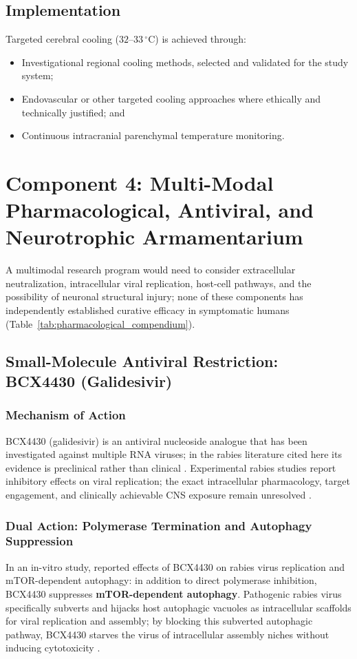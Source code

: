 \documentclass[12pt,a4paper]{article}
\begin{document}
\subsection{Implementation}

Targeted cerebral cooling ($32\text{--}33\,^{\circ}\mathrm{C}$) is achieved through:
\begin{itemize}
    \item Investigational regional cooling methods, selected and validated for the study system;
    \item Endovascular or other targeted cooling approaches where ethically and technically justified; and
    \item Continuous intracranial parenchymal temperature monitoring.
\end{itemize}

\section{Component 4: Multi-Modal Pharmacological, Antiviral, and Neurotrophic Armamentarium}

A multimodal research program would need to consider extracellular neutralization, intracellular viral replication, host-cell pathways, and the possibility of neuronal structural injury; none of these components has independently established curative efficacy in symptomatic humans \citep{scott2008rabies, jackson2013pathogenesis} (Table~\ref{tab:pharmacological_compendium}).

\subsection{Small-Molecule Antiviral Restriction: BCX4430 (Galidesivir)}

\subsubsection{Mechanism of Action}
BCX4430 (galidesivir) is an antiviral nucleoside analogue that has been investigated against multiple RNA viruses; in the rabies literature cited here its evidence is preclinical rather than clinical \citep{xie2023bcx}. Experimental rabies studies report inhibitory effects on viral replication; the exact intracellular pharmacology, target engagement, and clinically achievable CNS exposure remain unresolved \citep{xie2023bcx}.

\subsubsection{Dual Action: Polymerase Termination and Autophagy Suppression}
In an in-vitro study, \citet{xie2023bcx} reported effects of BCX4430 on rabies virus replication and mTOR-dependent autophagy: in addition to direct polymerase inhibition, BCX4430 suppresses \textbf{mTOR-dependent autophagy}. Pathogenic rabies virus specifically subverts and hijacks host autophagic vacuoles as intracellular scaffolds for viral replication and assembly; by blocking this subverted autophagic pathway, BCX4430 starves the virus of intracellular assembly niches without inducing cytotoxicity \citep{xie2023bcx}.
\end{document}
